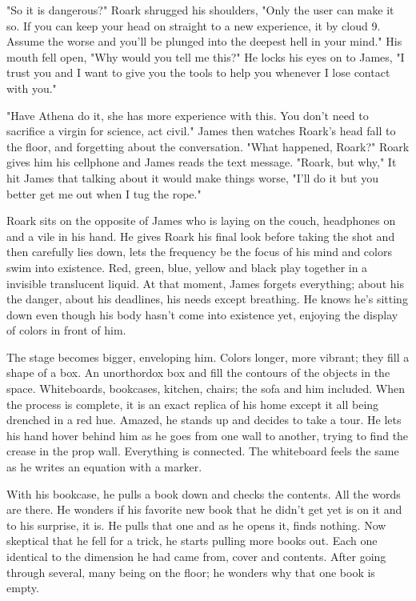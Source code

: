         "So it is dangerous?" Roark shrugged his shoulders, "Only the user can make it so. If you can keep your head on straight to a new 
    experience, it by cloud 9. Assume the worse and you'll be plunged into the deepest hell in your mind." His mouth fell open, "Why would
    you tell me this?"  He locks his eyes on to James, "I trust you and I want to give you the tools to help you whenever I lose contact with
    you."

        "Have Athena do it, she has more experience with this. You don't need to sacrifice a virgin for science, act civil." James then watches
    Roark's head fall to the floor, and forgetting about the conversation. "What happened, Roark?" Roark gives him his cellphone and James reads
    the text message. "Roark, but why," It hit James that talking about it would make things worse, "I'll do it but you better get me out when
    I tug the rope."

        Roark sits on the opposite of James who is laying on the couch, headphones on and a vile in his hand. He gives Roark his final look 
    before taking the shot and then carefully lies down, lets the frequency be the focus of his mind and colors swim into existence. Red, green,
    blue, yellow and black play together in a invisible translucent liquid. At that moment, James forgets everything; about his the danger,
    about his deadlines, his needs except breathing. He knows he's sitting down even though his body hasn't come into existence yet, enjoying
    the display of colors in front of him.

        The stage becomes bigger, enveloping him. Colors longer, more vibrant; they fill a shape of a box. An unorthordox box and fill the
    contours of the objects in the space. Whiteboards, bookcases, kitchen, chairs; the sofa and him included. When the process is complete,
    it is an exact replica of his home except it all being drenched in a red hue. Amazed, he stands up and decides to take a tour. He lets his
    hand hover behind him as he goes from one wall to another, trying to find the crease in the prop wall. Everything is connected. The 
    whiteboard feels the same as he writes an equation with a marker.

        With his bookcase, he pulls a book down and checks the contents. All the words are there. He wonders if his favorite new book that he
    didn't get yet is on it and to his surprise, it is. He pulls that one and as he opens it, finds nothing. Now skeptical that he fell for a
    trick, he starts pulling more books out. Each one identical to the dimension he had came from, cover and contents. After going through 
    several, many being on the floor; he wonders why that one book is empty.

